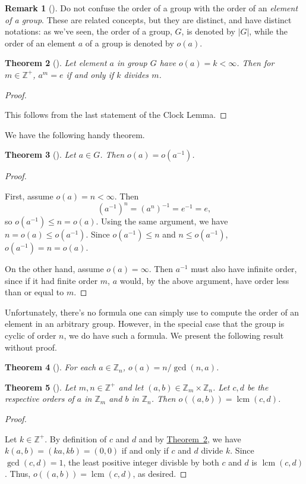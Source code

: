 \documentclass[10pt,]{book}
\theoremstyle{plain}
\newtheorem{theorem}{Theorem}[section]
\theoremstyle{definition}
\theoremstyle{definition}
\newtheorem{remark}[theorem]{Remark}
\theoremstyle{definition}
\theoremstyle{definition}
\numberwithin{equation}{section}
\def\Z{\mathbb{Z}}
\DeclareMathOperator{\lcm}{lcm}
\newcommand{\lt}{<}
\begin{document}
\begin{remark}[]\label{remark-22}
Do not confuse the order of a group with the order of an \emph{element of a group}. These are related concepts, but they are distinct, and have distinct notations: as we've seen, the order of a group, \(G\), is denoted by \(|G|\), while the order of an element \(a\) of a group is denoted by \(o(a)\).%
\end{remark}
\begin{theorem}[{}]\label{eltorderdivides}
Let element \(a\) in group \(G\) have \(o(a)=k \lt \infty\). Then for \(m\in \Z^+\), \(a^m=e\) if and only if \(k\) divides \(m\).%
\end{theorem}
\begin{proof}\hypertarget{proof-25}{}
This follows from the last statement of the Clock Lemma.%
\end{proof}
We have the following handy theorem.%
\begin{theorem}[{}]\label{invord}
Let \(a\in G\). Then \(o(a)=o(a^{-1})\).%
\end{theorem}
\begin{proof}\hypertarget{proof-26}{}
First, assume \(o(a)=n\lt \infty\). Then%
\begin{equation*}
(a^{-1})^n=(a^n)^{-1}=e^{-1}=e,
\end{equation*}
so \(o(a^{-1})\leq n=o(a)\). Using the same argument, we have \(n=o(a)\leq o(a^{-1})\). Since \(o(a^{-1})\leq n\) and \(n\leq o(a^{-1})\), \(o(a^{-1})=n=o(a)\).%
\par
On the other hand, assume \(o(a)= \infty\). Then \(a^{-1}\) must also have infinite order, since if it had finite order \(m\), \(a\) would, by the above argument, have order less than or equal to \(m\).%
\end{proof}
Unfortunately, there's no formula one can simply use to compute the order of an element in an arbitrary group. However, in the special case that the group is cyclic of order \(n\), we do have such a formula. We present the following result without proof.%
\begin{theorem}[{}]\label{znorders}
For each \(a\in \Z_n\), \(o(a)=n/\gcd(n,a)\).%
\end{theorem}
\begin{theorem}[{}]\label{theorem-28}
Let \(m,n \in \Z^+\) and let \((a,b)\in \Z_m \times \Z_n\). Let \(c, d\) be the respective orders of \(a\) in \(\Z_m\) and \(b\) in \(\Z_n\). Then \(o((a,b))=\lcm(c,d)\).%
\end{theorem}
\begin{proof}\hypertarget{proof-27}{}
Let \(k\in \Z^+\). By definition of \(c\) and \(d\) and by \hyperref[eltorderdivides]{Theorem~\ref{eltorderdivides}}, we have \(k(a,b)=(ka,kb)=(0,0)\) if and only if \(c\) and \(d\) divide \(k\). Since \(\gcd(c,d)=1\), the least positive integer divisble by both \(c\) and \(d\) is \(\lcm(c,d)\). Thus, \(o((a,b))=\lcm(c,d)\), as desired.%
\end{proof}
\end{document}
